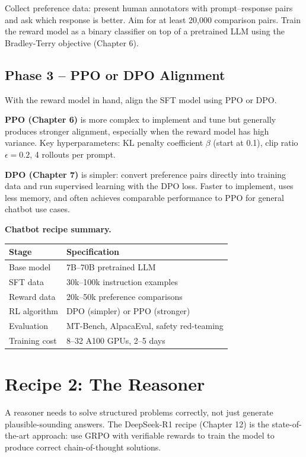 \begin{chapterenv}
Collect preference data: present human annotators with prompt--response pairs and ask which response is better. Aim for at least 20,000 comparison pairs. Train the reward model as a binary classifier on top of a pretrained LLM using the Bradley-Terry objective (Chapter 6).

\subsection{Phase 3 -- PPO or DPO Alignment}

With the reward model in hand, align the SFT model using PPO or DPO.

\textbf{PPO (Chapter 6)} is more complex to implement and tune but generally produces stronger alignment, especially when the reward model has high variance. Key hyperparameters: KL penalty coefficient $\beta$ (start at 0.1), clip ratio $\epsilon = 0.2$, 4 rollouts per prompt.

\textbf{DPO (Chapter 7)} is simpler: convert preference pairs directly into training data and run supervised learning with the DPO loss. Faster to implement, uses less memory, and often achieves comparable performance to PPO for general chatbot use cases.

\begin{infobox}
\textbf{Chatbot recipe summary.}

\begin{tabular}{ll}
\toprule
Stage & Specification \\
\midrule
Base model & 7B--70B pretrained LLM \\
SFT data & 30k--100k instruction examples \\
Reward data & 20k--50k preference comparisons \\
RL algorithm & DPO (simpler) or PPO (stronger) \\
Evaluation & MT-Bench, AlpacaEval, safety red-teaming \\
Training cost & 8--32 A100 GPUs, 2--5 days \\
\bottomrule
\end{tabular}
\end{infobox}

\section{Recipe 2: The Reasoner}

A reasoner needs to solve structured problems correctly, not just generate plausible-sounding answers. The DeepSeek-R1 recipe (Chapter 12) is the state-of-the-art approach: use GRPO with verifiable rewards to train the model to produce correct chain-of-thought solutions.


\end{chapterenv}
